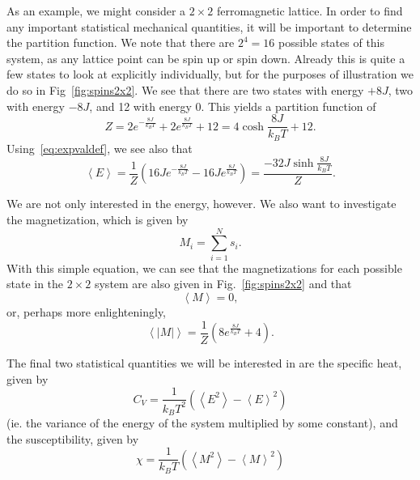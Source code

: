 \documentclass[12pt]{article}
\numberwithin{equation}{section}
\begin{document}
\par As an example, we might consider a $2\times2$ ferromagnetic lattice.  In order to find any important statistical mechanical quantities, it will be important to determine the partition function.  We note that there are $2^{4}=16$ possible states of this system, as any lattice point can be spin up or spin down.  Already this is quite a few states to look at explicitly individually, but for the purposes of illustration we do so in Fig~\ref{fig:spins2x2}.  We see that there are two states with energy $+8J$, two with energy $-8J$, and 12 with energy $0$.  This yields a partition function of
\begin{equation}
\label{eq:partition2x2}
Z=2e^{-\frac{8J}{k_{B}T}}+2e^{\frac{8J}{k_{B}T}}+12 = 4\cosh{\frac{8J}{k_{B}T}}+12.
\end{equation}
Using~\eqref{eq:expvaldef}, we see also that
\begin{equation}
\label{eq:expe2x2}
\left<E\right> = \frac{1}{Z}\left(16Je^{-\frac{8J}{k_{B}T}}-16Je^{\frac{8J}{k_{B}T}}\right) = \frac{-32J\sinh{\frac{8J}{k_{B}T}}}{Z}.
\end{equation}
\par We are not only interested in the energy, however.  We also want to investigate the magnetization, which is given by
\begin{equation}
\label{eq:mag}
M_{i}=\sum_{i=1}^{N}s_{i}.
\end{equation}
With this simple equation, we can see that the magnetizations for each possible state in the $2\times2$ system are also given in Fig.~\ref{fig:spins2x2} and that
\begin{equation}
\label{eq:expm2x2}
\left<M\right>=0,
\end{equation}
or, perhaps more enlighteningly,
\begin{equation}
\label{eq:expabsm2x2}
\left<\left|M\right|\right> = \frac{1}{Z}\left(8e^{\frac{8J}{k_{B}T}}+4\right).
\end{equation}
\par The final two statistical quantities we will be interested in are the specific heat, given by
\begin{equation}
\label{eq:cvdef}
C_{V} = \frac{1}{k_{B}T^{2}}\left(\left<E^{2}\right>-\left<E\right>^{2}\right)
\end{equation}
(ie. the variance of the energy of the system multiplied by some constant), and the susceptibility, given by
\begin{equation}
\label{eq:chidef}
\chi = \frac{1}{k_{B}T}\left(\left<M^{2}\right>-\left<M\right>^{2}\right)
\end{equation}
\end{document}
